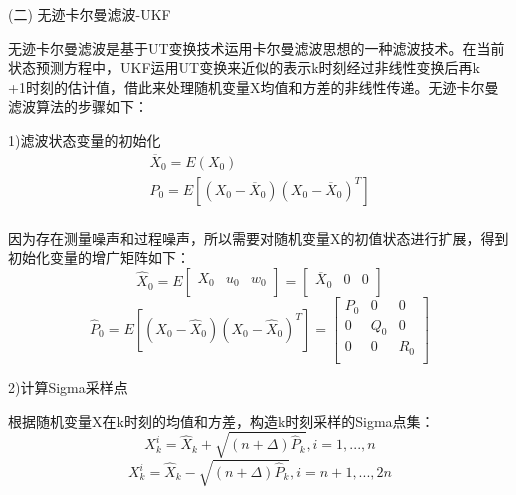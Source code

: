 (二)	无迹卡尔曼滤波-UKF

	无迹卡尔曼滤波是基于UT变换技术运用卡尔曼滤波思想的一种滤波技术。在当前状态预测方程中，UKF运用UT变换来近似的表示k时刻经过非线性变换后再k\\+1时刻的估计值，借此来处理随机变量X均值和方差的非线性传递。无迹卡尔曼滤波算法的步骤如下：

1)滤波状态变量的初始化
\begin{equation}
\begin{array}{l}
   {{\overline{X}}_{0}}=E\left( {{X}_{0}} \right) \\ 
  {{P}_{0}}=E\left[ \left( {{X}_{0}}-{{\overline{X}}_{0}} \right){{\left( {{X}_{0}}-{{\overline{X}}_{0}} \right)}^{T}} \right] \\ 
\end{array}
\end{equation}

因为存在测量噪声和过程噪声，所以需要对随机变量X的初值状态进行扩展，得到初始化变量的增广矩阵如下：
\begin{equation}
{{\widehat{X}}_{0}}=E\left[ \begin{matrix}
   {{X}_{0}} & {{u}_{0}} & {{w}_{0}}  \\
\end{matrix} \right]=\left[ \begin{matrix}
   {{\overline{X}}_{0}} & 0 & 0  \\
\end{matrix} \right]
\end{equation}
\begin{equation}
{{\widehat{P}}_{0}}=E\left[ \left( {{X}_{0}}-{{\widehat{X}}_{0}} \right){{\left( {{X}_{0}}-{{\widehat{X}}_{0}} \right)}^{T}} \right]=\left[ \begin{matrix}
   {{P}_{0}} & 0 & 0  \\
   0 & {{Q}_{0}} & 0  \\
   0 & 0 & {{R}_{0}}  \\
\end{matrix} \right]
\end{equation}

2)计算Sigma采样点

根据随机变量X在k时刻的均值和方差，构造k时刻采样的Sigma点集：
\begin{equation}
X_{k}^{i}={{\widehat{X}}_{k}}+\sqrt{(n+\Delta ){{\widehat{P}}_{k}}},i=1,...,n
\end{equation}    
\begin{equation}
X_{k}^{i}={{\widehat{X}}_{k}}-\sqrt{(n+\Delta ){{\widehat{P}}_{k}}},i=n+1,...,2n
\end{equation} 

